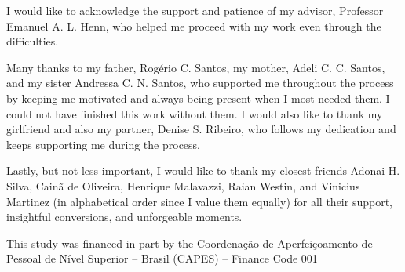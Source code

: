 \begin{agradecimentos}
	I would like to acknowledge the support and patience of my advisor, Professor Emanuel A. L. Henn, who helped me proceed with my work even through the difficulties.

	Many thanks to my father, Rogério C. Santos, my mother, Adeli C. C. Santos, and my sister Andressa C. N. Santos, who supported me throughout the process by keeping me motivated and always being present when I most needed them. I could not have finished this work without them. I would also like to thank my girlfriend and also my partner, Denise S. Ribeiro, who follows my dedication and keeps supporting me during the process.

	Lastly, but not less important, I would like to thank my closest friends Adonai H. Silva, Cainã de Oliveira, Henrique Malavazzi, Raian Westin, and Vinicius Martinez (in alphabetical order since I value them equally) for all their support, insightful conversions, and unforgeable moments.

	This study was financed in part by the Coordenação de Aperfeiçoamento de Pessoal de Nível Superior – Brasil (CAPES) – Finance Code 001



	
\end{agradecimentos}
